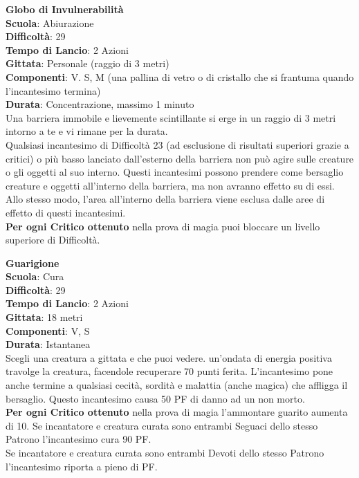 \begin{multicols}{2}
\medskip\textbf{Globo di Invulnerabilità}\\
\textbf{Scuola}: Abiurazione\\
\textbf{Difficoltà}: 29\\
\textbf{Tempo di Lancio}: 2 Azioni\\
\textbf{Gittata}: Personale (raggio di 3 metri)\\
\textbf{Componenti}: V. S, M (una pallina di vetro o di cristallo che si frantuma quando l'incantesimo termina) \\
\textbf{Durata}: Concentrazione, massimo 1 minuto\\
Una barriera immobile e lievemente scintillante si erge in un raggio di 3 metri intorno a te e vi rimane per la durata.\\
Qualsiasi incantesimo di Difficoltà 23 (ad esclusione di risultati superiori grazie a critici) o più basso lanciato dall'esterno della barriera non può agire sulle creature o gli oggetti al suo interno. Questi incantesimi possono prendere come bersaglio creature e oggetti all'interno della barriera, ma non avranno effetto su di essi. Allo stesso modo, l'area all'interno della barriera viene esclusa dalle aree di effetto di questi incantesimi.\\
\textbf{Per ogni Critico ottenuto} nella prova di magia puoi bloccare un livello superiore di Difficoltà.

\medskip\textbf{Guarigione}\\
\textbf{Scuola}: Cura\\
\textbf{Difficoltà}: 29\\
\textbf{Tempo di Lancio}: 2 Azioni\\
\textbf{Gittata}: 18 metri\\
\textbf{Componenti}: V, S\\
\textbf{Durata}: Istantanea\\
Scegli una creatura a gittata e che puoi vedere. un'ondata di energia positiva travolge la creatura, facendole recuperare 70 punti ferita. L'incantesimo pone anche termine a qualsiasi cecità, sordità e malattia (anche magica) che affligga il bersaglio. Questo incantesimo causa 50 PF di danno ad un non morto.\\
\textbf{Per ogni Critico ottenuto} nella prova di magia l'ammontare guarito aumenta di 10.
Se incantatore e creatura curata sono entrambi Seguaci dello stesso Patrono l'incantesimo cura 90 PF.\\
Se incantatore e creatura curata sono entrambi Devoti dello stesso Patrono l'incantesimo riporta a pieno di PF.\\


\end{multicols}
